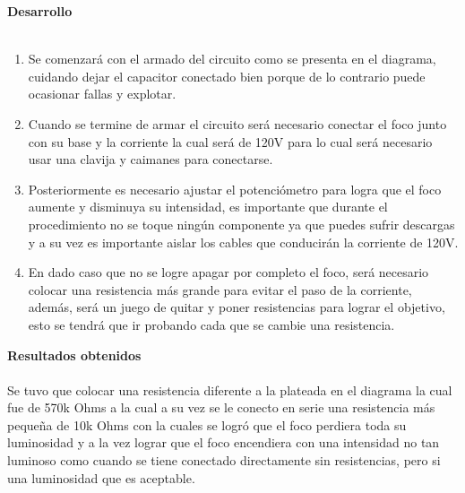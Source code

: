 \documentclass[12pt]{report}
\begin{document}
{\huge \textbf{Desarrollo}\\}\\
{\large \begin{enumerate}
\item Se comenzará con el armado del circuito como se presenta en el diagrama, cuidando dejar el capacitor conectado bien porque de lo contrario puede ocasionar fallas y explotar. 
\item Cuando se termine de armar el circuito será necesario conectar el foco junto con su base y la corriente la cual será de 120V para lo cual será necesario usar una clavija y caimanes para conectarse.
\item Posteriormente es necesario ajustar el potenciómetro para logra que el foco aumente y disminuya su intensidad, es importante que durante el procedimiento no se toque ningún componente ya que puedes sufrir descargas y a su vez es importante aislar los cables que conducirán la corriente de 120V.
\item En dado caso que no se logre apagar por completo el foco, será necesario colocar una resistencia más grande para evitar el paso de la corriente, además, será un juego de quitar y poner resistencias para lograr el objetivo, esto se tendrá que ir probando cada  que se cambie una resistencia.
\end{enumerate}}

{\huge \textbf{Resultados obtenidos}\\}\\
{\large Se tuvo que colocar una resistencia diferente a la plateada en el diagrama la cual fue de 570k Ohms a la cual a su vez se le conecto en serie una resistencia más pequeña de 10k Ohms con la cuales se logró que el foco perdiera toda su luminosidad y a la vez lograr que el foco encendiera con una intensidad no tan luminoso como cuando se tiene conectado directamente sin resistencias, pero si una luminosidad que es aceptable.}
\end{document}
